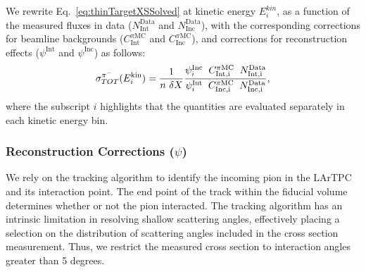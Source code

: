 \documentclass[%
 floatfix,
 reprint,
 twocolumn,
superscriptaddress,
showpacs,preprintnumbers,
 amsmath,amssymb,
 aps,
prd,
]{revtex4-1}
\begin{document}
We rewrite Eq.~\ref{eq:thinTargetXSSolved} at kinetic energy $E^{kin}_i$, as a function of the measured fluxes in data ($N^{\text{Data}}_{\text{Int}}$ and $N^{\text{Data}}_{\text{Inc}}$), with the corresponding corrections for beamline backgrounds ($C^{\pi \text{MC}}_{\text{Int}}$ and $C^{\pi \text{MC}}_{\text{Inc}}$), and corrections for reconstruction effects ($\psi^{\text{Int}}$ and $\psi^{\text{Inc}}$) as follows:
\begin{equation}
      \sigma^{\pi^-}_{TOT}(E^\text{kin}_{i})  = \frac{1}{n\text{ } \delta X}\frac{ \psi^{\text{Inc}}_i  \hspace{0.2cm} C^{\pi \text{MC}}_{\text{Int,i}}  \hspace{0.2cm} N^{\text{Data}}_{\text{Int,i}}  }{   \psi^{\text{Int}}_i \hspace{0.2cm} C^{\pi \text{MC}}_{\text{Inc,i}}  \hspace{0.2cm}  N^{\text{Data}}_{\text{Inc,i}} },
\label{eq:C}
\end{equation}
where the subscript $i$ highlights that the quantities are evaluated separately in each kinetic energy bin.

\subsubsection{Reconstruction Corrections ($\psi$)}
We rely on the tracking algorithm to identify the incoming pion in the LArTPC and its interaction point. The end point of the track within the fiducial volume determines whether or not the pion interacted.  The tracking algorithm has an intrinsic limitation in resolving shallow scattering angles, effectively placing a selection on the distribution of scattering angles included in the cross section measurement.  %
Thus, we restrict the measured cross section to interaction angles greater than 5 degrees. 
\end{document}
